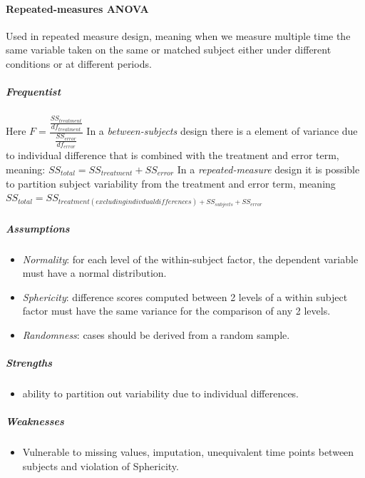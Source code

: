 \paragraph{Repeated-measures ANOVA}
Used in repeated measure design, meaning when we measure multiple time the same variable
taken on the same or matched subject either under different conditions or at different periods.
\subparagraph{Frequentist}
Here $F = \dfrac{\frac{SS_{treatment}}{df_{treatment}}}{\frac{SS_{error}}{df_{error}}}$
In a \emph{between-subjects} design there is a element of variance due to individual difference that 
is combined with the treatment and error term, meaning: $SS_{total} = SS_{treatment} + SS_{error}$
In a \emph{repeated-measure} design it is possible to partition subject variability from the
treatment and error term, meaning $SS_{total} = SS_{treatment(excluding indivdual differences) + SS_{subjects} + SS_{error}}$

\subparagraph{Assumptions}
\begin{itemize}
    \item \emph{Normality}: for each level of the within-subject factor, the dependent variable must have a normal distribution.
    \item \emph{Sphericity}: difference scores computed between 2 levels of a within subject factor must have the same variance
    for the comparison of any 2 levels.
    \item \emph{Randomness}: cases should be derived from a random sample.
\end{itemize}
\subparagraph{Strengths}
\begin{itemize}
    \item ability to partition out variability due to individual differences.
\end{itemize}
\subparagraph{Weaknesses}
\begin{itemize}
    \item Vulnerable to missing values, imputation, unequivalent time points
    between subjects and violation of Sphericity.
\end{itemize}


